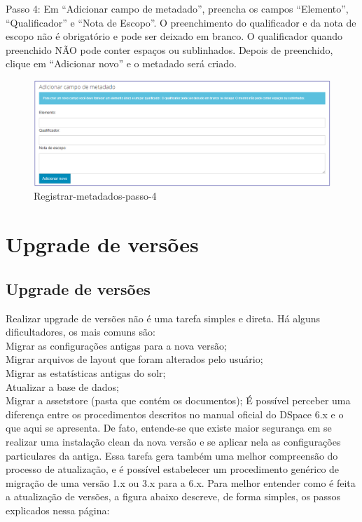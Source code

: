 \documentclass[12pt,hidelinks]{article}
\begin{document}
Passo 4: Em “Adicionar campo de metadado”, preencha os campos “Elemento”, “Qualificador” e “Nota de Escopo”. O preenchimento do qualificador e da nota de escopo não é obrigatório e pode ser deixado em branco. O qualificador quando preenchido NÃO pode conter espaços ou sublinhados. Depois de preenchido, clique em “Adicionar novo” e o metadado será criado.

        \begin{figure}[!htp]
                \centering
                \includegraphics[scale=0.5]{figura/registrar-metadados-passo4.png}
                \caption{Registrar-metadados-passo-4}
            \label{Rotulo}
        \end{figure}

\newpage
\section{Upgrade de versões}
\newpage
\subsection{Upgrade de versões}
Realizar upgrade de versões não é uma tarefa simples e direta. Há alguns dificultadores, os mais comuns são:\\

\textbullet \hspace{6pt} Migrar as configurações antigas para a nova versão;\\
\textbullet \hspace{6pt} Migrar arquivos de layout que foram alterados pelo usuário;\\
\textbullet \hspace{6pt} Migrar as estatísticas antigas do solr;\\
\textbullet \hspace{6pt} Atualizar a base de dados;\\
\textbullet \hspace{6pt} Migrar a assetstore (pasta que contém os documentos);
\singlespacing
É possível perceber uma diferença entre os procedimentos descritos no manual oficial do DSpace 6.x e o que aqui se apresenta. De fato, entende-se que existe maior segurança em se realizar uma instalação clean da nova versão e se aplicar nela as configurações particulares da antiga. Essa tarefa gera também uma melhor compreensão do processo de atualização, e é possível estabelecer um procedimento genérico de migração de uma versão 1.x ou 3.x para a 6.x.
\singlespacing
Para melhor entender como é feita a atualização de versões, a figura abaixo descreve, de forma simples, os passos explicados nessa página:
\end{document}
